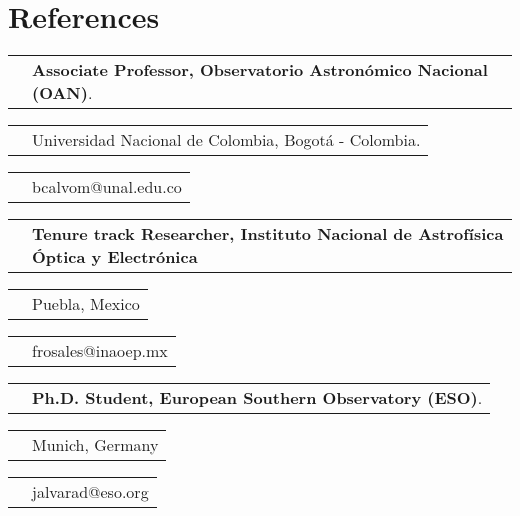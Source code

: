 \documentclass[11pt,letterpaper,sans]{moderncv}        %
\makeatletter
\renewcommand*{\cvitem}[3][.25em]{%
  \begin{tabular}{@{}p{\hintscolumnwidth}@{\hspace{\separatorcolumnwidth}}p{\maincolumnwidth}@{}}%
      \raggedleft\hintstyle{#2} &{#3}%
  \end{tabular}%
  \par\addvspace{#1}}
\makeatother
\begin{document}
\section{References}
\cvitem{\textbf{Benjam\'{i}n}}{\textbf{Associate Professor, Observatorio Astronómico Nacional (OAN)}.}
\cvitem{\textbf{Calvo-Mozo}}{Universidad Nacional de Colombia, Bogotá - Colombia.}
\cvitem{}{bcalvom@unal.edu.co}
\cvitem{\textbf{Fabi\'an }}{\textbf{Tenure track Researcher, Instituto Nacional de Astrof\'{i}sica \'{O}ptica y Electr\'onica }}
\cvitem{\textbf{Rosales}}{Puebla, Mexico}
\cvitem{\textbf{Ortega}}{frosales@inaoep.mx}
\cvitem{\textbf{Julian David}}{\textbf{Ph.D. Student, European Southern Observatory (ESO)}.}
\cvitem{\textbf{Alvarado}}{Munich, Germany}
\cvitem{\textbf{G\'omez}}{jalvarad@eso.org }
\nocite{*}



\end{document}

